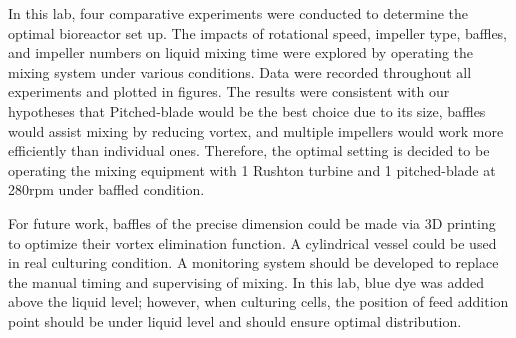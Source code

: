 In this lab, four comparative experiments were conducted to determine the optimal bioreactor set up.
The impacts of rotational speed, impeller type, baffles, and impeller numbers on liquid mixing time were explored by operating the mixing system under various conditions. Data were recorded throughout all experiments and plotted in figures.
The results were consistent with our hypotheses that Pitched-blade would be the best choice due to its size, baffles would assist mixing by reducing vortex, and multiple impellers would work more efficiently than individual ones.
Therefore, the optimal setting is decided to be operating the mixing equipment with 1 Rushton turbine and 1 pitched-blade at 280rpm under baffled condition. 

For future work, baffles of the precise dimension could be made via 3D printing to optimize their vortex elimination function.
A cylindrical vessel could be used in real culturing condition.
A monitoring system should be developed to replace the manual timing and supervising of mixing.
In this lab, blue dye was added above the liquid level; however, when culturing cells, the position of feed addition point should be under liquid level and should ensure optimal distribution. 
